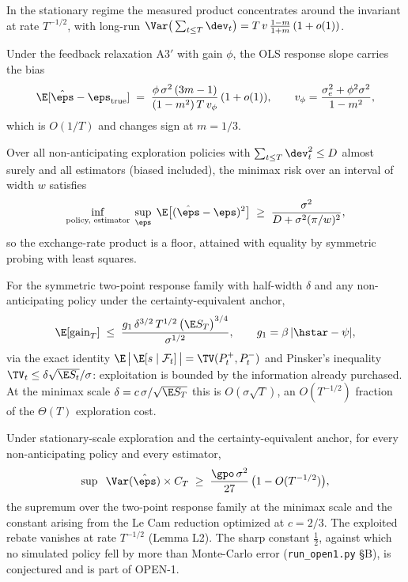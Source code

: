 \begin{proposition}[Concentration; P2.1]
In the stationary regime the measured product concentrates around the
invariant at rate $T^{-1/2}$, with long-run
$\Var\big(\sum_{t\le T}\dev_t\big) = T\,v\,\tfrac{1-m}{1+m}\,(1+o(1))$.
\end{proposition}

\begin{proposition}
Under the feedback relaxation A3$'$ with gain $\phi$, the OLS response
slope carries the bias
\[
\E[\hat\eps - \eps_{\mathrm{true}}] \;=\;
\frac{\phi\,\sigma^2\,(3m-1)}{(1-m^2)\,T\,v_\phi}\,(1+o(1)),
\qquad v_\phi = \frac{\sigma_e^2 + \phi^2\sigma^2}{1-m^2},
\]
which is $O(1/T)$ and changes sign at $m = 1/3$.
\end{proposition}

\begin{theorem}
Over all non-anticipating exploration policies with
$\sum_{t\le T} \dev_t^2 \le D$ almost surely and all estimators (biased
included), the minimax risk over an interval of width $w$ satisfies
\[
\inf_{\text{policy, estimator}}\;\sup_{\eps}\;
\E\big[(\hat\eps - \eps)^2\big] \;\ge\;
\frac{\sigma^2}{D + \sigma^2 (\pi/w)^2},
\]
so the exchange-rate product is a floor, attained with equality by
symmetric probing with least squares.
\end{theorem}

\begin{lemma}
For the symmetric two-point response family with half-width $\delta$ and
any non-anticipating policy under the certainty-equivalent anchor,
\[
\E[\mathrm{gain}_T] \;\le\;
\frac{g_1\,\delta^{3/2}\,T^{1/2}\,\big(\E S_T\big)^{3/4}}{\sigma^{1/2}},
\qquad g_1 = \beta\,|\hstar - \psi|,
\]
via the exact identity $\E\,\big|\,\E[s\mid\mathcal{F}_t]\,\big|
= \TV(P^+_t, P^-_t)$ and Pinsker's inequality
$\TV_t \le \delta\sqrt{\E S_t}/\sigma$: exploitation is bounded by the
information already purchased. At the minimax scale
$\delta = c\,\sigma/\sqrt{\E S_T}$ this is $O(\sigma\sqrt{T})$, an
$O(T^{-1/2})$ fraction of the $\Theta(T)$ exploration cost.
\end{lemma}

\begin{theorem}
Under stationary-scale exploration and the certainty-equivalent anchor,
for every non-anticipating policy and every estimator,
\[
\sup\;\;\Var(\hat\eps)\times C_T \;\ge\; \frac{\gpo\,\sigma^2}{27}\,
\big(1 - O(T^{-1/2})\big),
\]
the supremum over the two-point response family at the minimax scale and
the constant arising from the Le Cam reduction optimized at $c = 2/3$.
The exploited rebate vanishes at rate $T^{-1/2}$ (Lemma L2). The sharp
constant $\tfrac{1}{2}$, against which no simulated policy fell by more
than Monte-Carlo error (\texttt{run\_open1.py} \S B), is conjectured and
is part of OPEN-1.
\end{theorem}

